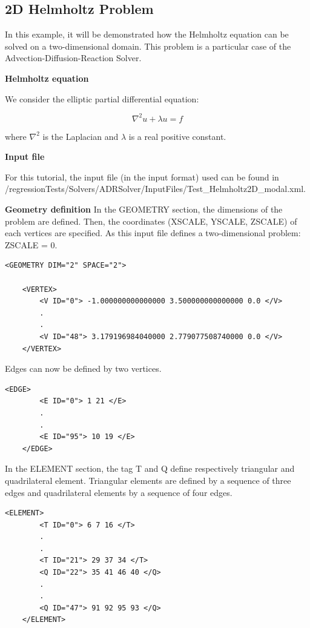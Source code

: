 \subsection{2D Helmholtz Problem}

In this example, it will be demonstrated how the Helmholtz equation can be solved on a two-dimensional domain. 
This problem is a particular case of the Advection-Diffusion-Reaction Solver.

\textbf{Helmholtz equation}

We consider the elliptic partial differential equation:

\begin{equation}
\nabla^2 u  + \lambda u =  f
\end{equation}

where $\nabla^2$ is the Laplacian and $\lambda$ is a real positive constant.

\textbf{Input file} 

For this tutorial, the input file (in the \nekpp input format) used can be found
 in  \nekpp/regressionTests/Solvers/ADRSolver/InputFiles/Test\_Helmholtz2D\_modal.xml.

\textbf{\footnotesize{Geometry definition}}
In the GEOMETRY section, the dimensions of the problem are defined. 
Then, the coordinates (XSCALE, YSCALE, ZSCALE) of each vertices are specified. As this input file defines a two-dimensional problem: ZSCALE = 0.

\begin{lstlisting}[style=XMLStyle]
<GEOMETRY DIM="2" SPACE="2">

    <VERTEX>
        <V ID="0"> -1.000000000000000 3.500000000000000 0.0 </V>
        .
        .
        <V ID="48"> 3.179196984040000 2.779077508740000 0.0 </V>
    </VERTEX>
\end{lstlisting}

Edges can now be defined by two vertices.

\begin{lstlisting}[style=XMLStyle]
 <EDGE>
        <E ID="0"> 1 21 </E>
        .
        .
        <E ID="95"> 10 19 </E>
    </EDGE>
\end{lstlisting}

In the ELEMENT section, the tag T and Q define respectively triangular and quadrilateral element.
 Triangular elements are defined by a sequence of three edges and quadrilateral elements by a sequence of four edges.

\begin{lstlisting}[style=XMLStyle]
<ELEMENT>
        <T ID="0"> 6 7 16 </T>
        .
        .
        <T ID="21"> 29 37 34 </T>
        <Q ID="22"> 35 41 46 40 </Q>
        .
        .
        <Q ID="47"> 91 92 95 93 </Q>
    </ELEMENT>
\end{lstlisting}

